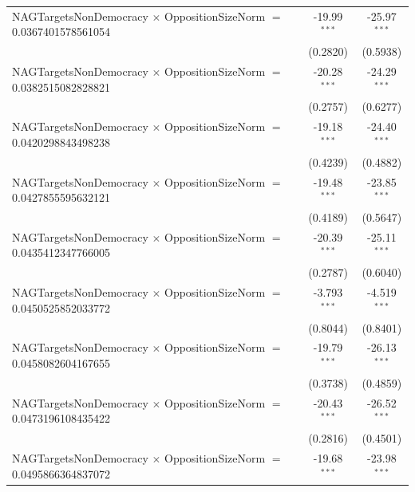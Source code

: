 \begin{tabular}{lcc}
   NAGTargetsNonDemocracy $\times$ OppositionSizeNorm $=$ 0.0367401578561054    & -19.99$^{***}$       & -25.97$^{***}$\\   
                                                                                & (0.2820)             & (0.5938)\\   
   NAGTargetsNonDemocracy $\times$ OppositionSizeNorm $=$ 0.0382515082828821    & -20.28$^{***}$       & -24.29$^{***}$\\   
                                                                                & (0.2757)             & (0.6277)\\   
   NAGTargetsNonDemocracy $\times$ OppositionSizeNorm $=$ 0.0420298843498238    & -19.18$^{***}$       & -24.40$^{***}$\\   
                                                                                & (0.4239)             & (0.4882)\\   
   NAGTargetsNonDemocracy $\times$ OppositionSizeNorm $=$ 0.0427855595632121    & -19.48$^{***}$       & -23.85$^{***}$\\   
                                                                                & (0.4189)             & (0.5647)\\   
   NAGTargetsNonDemocracy $\times$ OppositionSizeNorm $=$ 0.0435412347766005    & -20.39$^{***}$       & -25.11$^{***}$\\   
                                                                                & (0.2787)             & (0.6040)\\   
   NAGTargetsNonDemocracy $\times$ OppositionSizeNorm $=$ 0.0450525852033772    & -3.793$^{***}$       & -4.519$^{***}$\\   
                                                                                & (0.8044)             & (0.8401)\\   
   NAGTargetsNonDemocracy $\times$ OppositionSizeNorm $=$ 0.0458082604167655    & -19.79$^{***}$       & -26.13$^{***}$\\   
                                                                                & (0.3738)             & (0.4859)\\   
   NAGTargetsNonDemocracy $\times$ OppositionSizeNorm $=$ 0.0473196108435422    & -20.43$^{***}$       & -26.52$^{***}$\\   
                                                                                & (0.2816)             & (0.4501)\\   
   NAGTargetsNonDemocracy $\times$ OppositionSizeNorm $=$ 0.0495866364837072    & -19.68$^{***}$       & -23.98$^{***}$\\   

\end{tabular}
